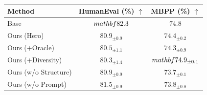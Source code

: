 \begin{tabular}{lcc}
\toprule
Method & HumanEval (\%) $\uparrow$ & MBPP (\%) $\uparrow$ \\
\midrule
Base & $\\mathbf{82.3}$ & $74.8$ \\
Ours (Hero) & $80.9_{\pm 0.9}$ & $74.4_{\pm 0.2}$ \\
Ours (+Oracle) & $80.5_{\pm 1.1}$ & $74.3_{\pm 0.9}$ \\
Ours (+Diversity) & $80.3_{\pm 1.4}$ & $\\mathbf{74.9_{\pm 0.1}}$ \\
Ours (w/o Structure) & $80.9_{\pm 0.9}$ & $73.7_{\pm 0.1}$ \\
Ours (w/o Prompt) & $81.5_{\pm 0.9}$ & $73.8_{\pm 0.8}$ \\
\bottomrule
\end{tabular}

